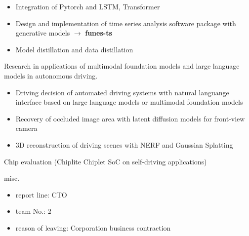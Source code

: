 \documentclass[../cv.tex]{subfiles}
\begin{document}
\begin{cventries}
{\begin{cvitems}
\begin{itemize}
				\item Integration of Pytorch and LSTM, Transformer
				\item Design and implementation of time series analysis software package with generative models
				      $\rightarrow$ \textbf{funes-ts} \href{https://github.com/binjian/funes-ts/}{\faGithub}
				\item Model distillation and data distillation
			\end{itemize}
			\item Research in applications of multimodal foundation models and large language models in autonomous driving.
			\begin{itemize}
				\item Driving decision of automated driving systems with natural languange interface based on large language models or multimodal foundation models \supercite{Xin_LLM_24}  \supercite{Xin_VLM_24}
				\item Recovery of occluded image area with latent diffusion models for front-view camera \supercite{Xin_Latent_Diffusion_23}
				\item 3D reconstruction of driving scenes with NERF and Gaussian Splatting
			\end{itemize}
			\item Chip evaluation (Chiplite Chiplet SoC on self-driving applications)
			\item misc.
			\begin{itemize}
				\item report line: CTO
				\item team No.: 2
				\item reason of leaving: Corporation business contraction
			\end{itemize}
		\end{cvitems}
	}


\end{cventries}
\end{document}
